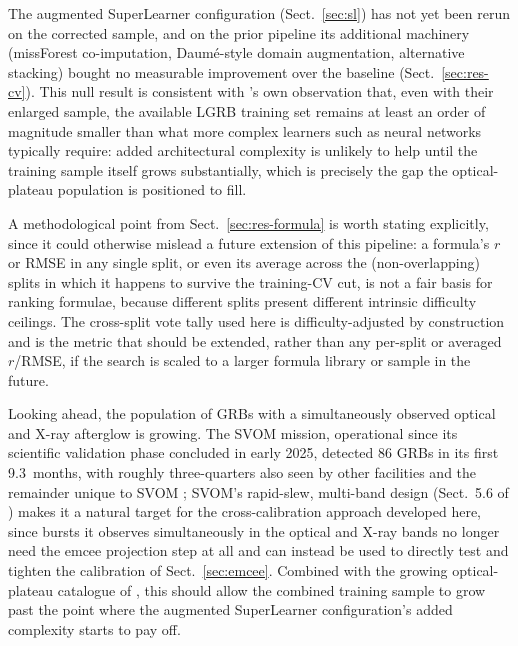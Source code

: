 \documentclass{aa}
\begin{document}
The augmented SuperLearner configuration (Sect.~\ref{sec:sl}) has not yet been
rerun on the corrected sample, and on the prior pipeline its additional
machinery (missForest co-imputation, Daum\'e-style domain augmentation,
alternative stacking) bought no measurable improvement over the baseline
(Sect.~\ref{sec:res-cv}). This null result is consistent with
\citet{narendra2025}'s own observation that, even with their enlarged sample,
the available LGRB training set remains at least an order of magnitude
smaller than what more complex learners such as neural networks typically
require: added architectural complexity is unlikely to help until the
training sample itself grows substantially, which is precisely the gap the
optical-plateau population is positioned to fill.

A methodological point from Sect.~\ref{sec:res-formula} is worth stating
explicitly, since it could otherwise mislead a future extension of this
pipeline: a formula's $r$ or RMSE in any single split, or even its average
across the (non-overlapping) splits in which it happens to survive the
training-CV cut, is not a fair basis for ranking formulae, because different
splits present different intrinsic difficulty ceilings. The cross-split vote
tally used here is difficulty-adjusted by construction and is the metric that
should be extended, rather than any per-split or averaged $r$/RMSE, if the
search is scaled to a larger formula library or sample in the future.

Looking ahead, the population of GRBs with a simultaneously observed optical
and X-ray afterglow is growing. The SVOM mission, operational since its
scientific validation phase concluded in early 2025, detected 86 GRBs in its
first 9.3~months, with roughly three-quarters also seen by other facilities
and the remainder unique to SVOM \citep{daigne2026}; SVOM's rapid-slew,
multi-band design (Sect.~5.6 of \citealt{narendra2025}) makes it a natural
target for the cross-calibration approach developed here, since bursts it
observes simultaneously in the optical and X-ray bands no longer need the
emcee projection step at all and can instead be used to directly test and
tighten the calibration of Sect.~\ref{sec:emcee}. Combined with the growing
optical-plateau catalogue of \citet{dainotti2024a}, this should allow the
combined training sample to grow past the point where the augmented
SuperLearner configuration's added complexity starts to pay off.

\end{document}
